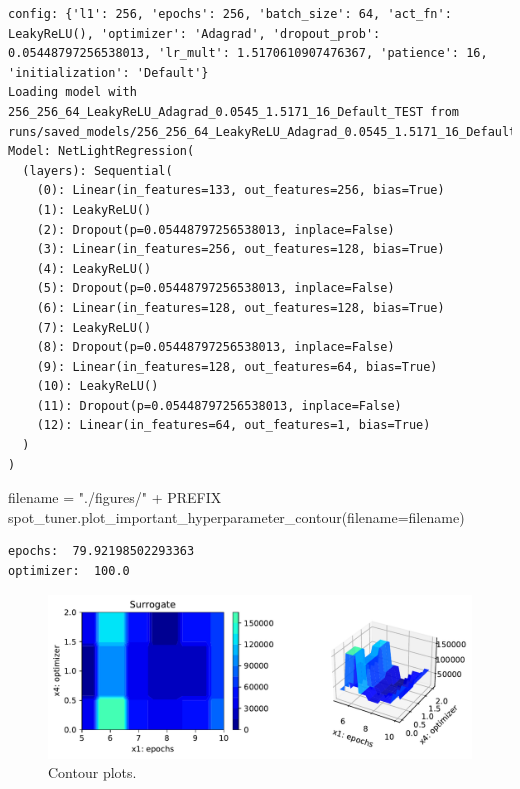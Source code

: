 \documentclass[
  letterpaper,
  DIV=11,
  numbers=noendperiod]{scrreprt}
\newenvironment{Shaded}{\begin{snugshade}}{\end{snugshade}}
\newcommand{\NormalTok}[1]{\textcolor[rgb]{0.00,0.23,0.31}{#1}}
\newcommand{\OperatorTok}[1]{\textcolor[rgb]{0.37,0.37,0.37}{#1}}
\newcommand{\StringTok}[1]{\textcolor[rgb]{0.13,0.47,0.30}{#1}}
\begin{document}
\begin{verbatim}
config: {'l1': 256, 'epochs': 256, 'batch_size': 64, 'act_fn': LeakyReLU(), 'optimizer': 'Adagrad', 'dropout_prob': 0.05448797256538013, 'lr_mult': 1.5170610907476367, 'patience': 16, 'initialization': 'Default'}
Loading model with 256_256_64_LeakyReLU_Adagrad_0.0545_1.5171_16_Default_TEST from runs/saved_models/256_256_64_LeakyReLU_Adagrad_0.0545_1.5171_16_Default_TEST/last.ckpt
Model: NetLightRegression(
  (layers): Sequential(
    (0): Linear(in_features=133, out_features=256, bias=True)
    (1): LeakyReLU()
    (2): Dropout(p=0.05448797256538013, inplace=False)
    (3): Linear(in_features=256, out_features=128, bias=True)
    (4): LeakyReLU()
    (5): Dropout(p=0.05448797256538013, inplace=False)
    (6): Linear(in_features=128, out_features=128, bias=True)
    (7): LeakyReLU()
    (8): Dropout(p=0.05448797256538013, inplace=False)
    (9): Linear(in_features=128, out_features=64, bias=True)
    (10): LeakyReLU()
    (11): Dropout(p=0.05448797256538013, inplace=False)
    (12): Linear(in_features=64, out_features=1, bias=True)
  )
)
\end{verbatim}

\begin{Shaded}
\begin{Highlighting}[]
\NormalTok{filename }\OperatorTok{=} \StringTok{"./figures/"} \OperatorTok{+}\NormalTok{ PREFIX}
\NormalTok{spot\_tuner.plot\_important\_hyperparameter\_contour(filename}\OperatorTok{=}\NormalTok{filename)}
\end{Highlighting}
\end{Shaded}

\begin{verbatim}
epochs:  79.92198502293363
optimizer:  100.0
\end{verbatim}

\begin{figure}[H]

{\centering \includegraphics{033_spot_lightning_linear_sensitive_files/figure-pdf/cell-21-output-2.pdf}

}

\caption{Contour plots.}

\end{figure}%
\end{document}
